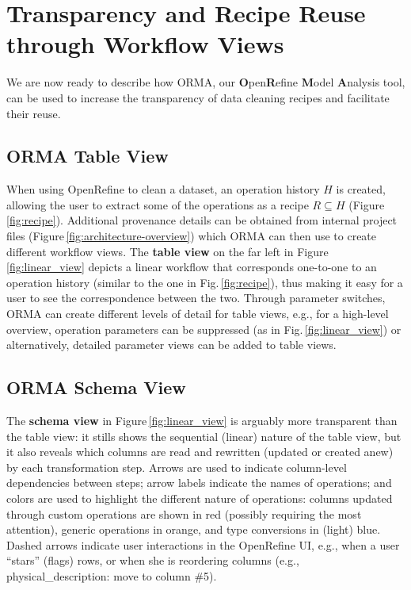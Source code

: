 \documentclass[conference]{ijdc-v14}
\newcommand{\Figref}[1]{Figure\,\ref{#1}}
\newcommand{\figref}[1]{Fig.\,\ref{#1}}
\newcommand{\orma}{\textsf{ORMA}\xspace}  %
\newcommand{\openrefine}{\textrm{OpenRefine}\xspace}
\newcommand{\co}[1]{\textsf{\small{#1}}}
\begin{document}
\section{Transparency and Recipe Reuse through Workflow Views}

We are now ready to describe how \orma, our \textbf{O}pen\textbf{R}efine \textbf{M}odel
\textbf{A}nalysis tool, can be used to increase the transparency of data cleaning recipes and
facilitate their reuse.

\subsection{\orma Table View}

When using \openrefine to clean a dataset, an operation history $H$ is created, allowing the user to
extract some of the operations as a recipe $R\subseteq H$ (\Figref{fig:recipe}). Additional
provenance details can be obtained from internal project files (\Figref{fig:architecture-overview})
which \orma can then use to create different workflow views. The \textbf{table view} on the far left
in \Figref{fig:linear_view} depicts a linear workflow that corresponds one-to-one to an operation
history (similar to the one in \figref{fig:recipe}), thus making it easy for a user to see the
correspondence between the two. Through parameter switches, \orma can create different levels of
detail for table views, e.g., for a high-level overview, operation parameters can be suppressed (as
in \figref{fig:linear_view}) or alternatively, detailed parameter views can be added to table views.

\subsection{\orma Schema View}
 
The \textbf{schema view} in \Figref{fig:linear_view} is arguably more transparent than the table
view: it stills shows the sequential (linear) nature of the table view, but it also reveals which
columns are read and rewritten (updated or created anew) by each transformation step. Arrows are
used to indicate column-level dependencies between steps; arrow labels indicate the names of
operations; and colors are used to highlight the different nature of operations: columns updated
through custom operations are shown in red (possibly requiring the most attention), generic
operations in orange, and type conversions in (light) blue. Dashed arrows indicate user
interactions in the \openrefine UI, e.g., when a user ``stars'' (flags) rows, or when she is
reordering columns (e.g., \co{physical\_description: move to column \#5}).
\end{document}
